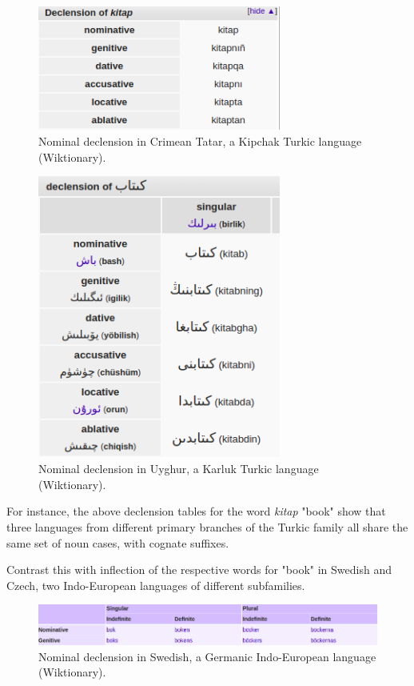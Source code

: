 \begin{figure}[ht]
\includegraphics[width=8cm]{images/Crimean_Tatar_kitap.png}
\centering
\caption{Nominal declension in Crimean Tatar, a Kipchak Turkic language (Wiktionary).}
\end{figure}

\begin{figure}[p]
\includegraphics[width=8cm]{images/Uyghur_kitap.png}
\centering
\caption{Nominal declension in Uyghur, a Karluk Turkic language (Wiktionary).}
\end{figure}

For instance, the above declension tables for the word \textit{kitap} "book" show that three languages from different primary branches of the Turkic family all share the same set of noun cases, with cognate suffixes.

Contrast this with inflection of the respective words for "book" in Swedish and Czech, two Indo-European languages of different subfamilies.

\begin{figure}[p]
\includegraphics[width=13cm]{images/Swedish_bok.png}
\centering
\caption{Nominal declension in Swedish, a Germanic Indo-European language (Wiktionary).}
\end{figure}

